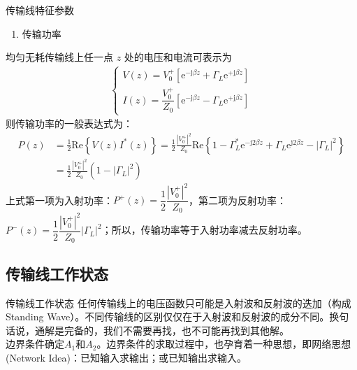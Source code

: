\begin{frame}{传输线特征参数}
  \begin{enumerate}
    \resume
    \item 传输功率
  \end{enumerate}
  均匀无耗传输线上任一点 $z$ 处的电压和电流可表示为
  \begin{align*}
    \begin{cases}
      V(z)=V_0^+\left[\mathrm{e}^{-\mathrm{j}\beta z}+\Gamma_L\mathrm{e}^{+\mathrm{j}\beta z} \right] \\
      I(z)=\dfrac{V_0^+}{Z_0}\left[ \mathrm{e}^{-\mathrm{j}\beta z}-\Gamma_L\mathrm{e}^{+\mathrm{j}\beta z}\right]
    \end{cases}
  \end{align*}
  则传输功率的一般表达式为：
  \begin{align*}
    P(z)&=\frac{1}{2}\mathrm{Re}\left\{V(z)I^*(z)\right\}=\frac{1}{2}\frac{|V_0^+|^2}{Z_0}\mathrm{Re}\left\{1-\Gamma_L^*\mathrm{e}^{-\mathrm{j}2\beta z}+\Gamma_L\mathrm{e}^{\mathrm{j}2\beta z}-|\Gamma_L|^2\right\}\\
        &=\frac{1}{2}\frac{|V_0^+|^2}{Z_0}(1-|\Gamma_L|^2)
  \end{align*}
  上式第一项为入射功率：$P^+(z)=\dfrac{1}{2}\dfrac{|V_0^+|^2}{Z_0}$，第二项为反射功率：$P^-(z)=\dfrac{1}{2}\dfrac{|V_0^+|^2}{Z_0}|\Gamma_L|^2$；所以，传输功率等于入射功率减去反射功率。
\end{frame}

\subsection{传输线工作状态}
\begin{frame}{传输线工作状态}
 任何传输线上的电压函数只可能是入射波和反射波的迭加（构成Standing Wave）。不同传输线的区别仅仅在于入射波和反射波的成分不同。换句话说，通解是完备的，我们不需要再找，也不可能再找到其他解。\\
 边界条件确定$A_{1}$和$A_{2}$。边界条件的求取过程中，也孕育着一种思想，即网络思想(Network Idea)：已知输入求输出；或已知输出求输入。
\end{frame}

